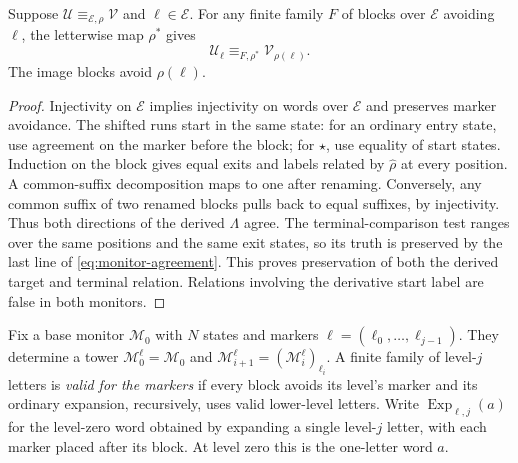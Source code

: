 \begin{lemma}\label{lem:agreement-derivative}
Suppose $\mathcal U\equiv_{\mathcal E,\rho}\mathcal V$ and $\ell\in \mathcal E$.
For any finite family $F$ of blocks over $\mathcal E$ avoiding $\ell$, the
letterwise map $\rho^*$ gives
\[
 \mathcal U_\ell\equiv_{F,\rho^*}\mathcal V_{\rho(\ell)}.
\]
The image blocks avoid $\rho(\ell)$.
\end{lemma}
\begin{proof}
Injectivity on $\mathcal E$ implies injectivity on words over $\mathcal E$ and preserves
marker avoidance. The shifted runs start in the same state: for an
ordinary entry state, use agreement on the marker before the block;
for $\star$, use equality of start states. Induction on the block gives
equal exits and labels related by $\widehat\rho$ at every position.
A common-suffix decomposition maps to one after renaming. Conversely,
any common suffix of two renamed blocks pulls back to equal suffixes,
by injectivity. Thus both directions of the derived $\Lambda$ agree.
The terminal-comparison test ranges over the same positions and the same
exit states, so its truth is preserved by the last line of
\eqref{eq:monitor-agreement}. This proves preservation of both the
derived target and terminal relation. Relations involving the derivative
start label are false in both monitors.
\end{proof}

Fix a base monitor $\mathcal M_0$ with $N$ states and markers
$\boldsymbol\ell=(\ell_0,\ldots,\ell_{j-1})$. They determine a tower
$\mathcal M^{\boldsymbol\ell}_0=\mathcal M_0$ and
$\mathcal M^{\boldsymbol\ell}_{i+1}
=(\mathcal M^{\boldsymbol\ell}_i)_{\ell_i}$.
A finite family of level-$j$ letters is \emph{valid for the markers}
if every block avoids its level's marker and its ordinary expansion,
recursively, uses valid lower-level letters. Write
$\operatorname{Exp}_{\boldsymbol\ell,j}(a)$ for the level-zero word
obtained by expanding a single level-$j$ letter, with each marker
placed after its block. At level zero this is the one-letter word $a$.


